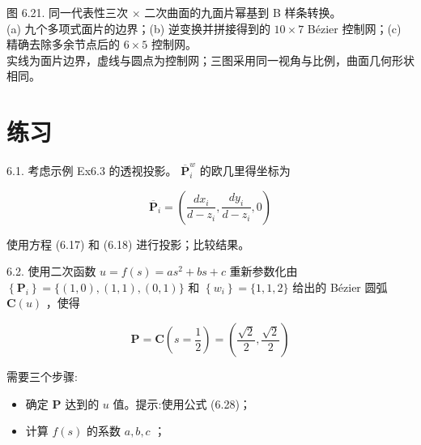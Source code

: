 \documentclass[../main.tex]{subfiles}
\begin{document}
\begin{center}
\begin{minipage}{28cm}
\vspace*{.6\baselineskip}
\centering
\begin{minipage}{13cm}\centering
{}
\end{minipage}
\par\medskip
\begin{minipage}{26.4cm}\centering
{}
\end{minipage}
\par\smallskip
图 6.21. 同一代表性三次 $\times$ 二次曲面的九面片幂基到 B 样条转换。\\
(a) 九个多项式面片的边界；(b) 逆变换并拼接得到的 $10\times7$ Bézier 控制网；(c) 精确去除多余节点后的 $6\times5$ 控制网。\\
实线为面片边界，虚线与圆点为控制网；三图采用同一视角与比例，曲面几何形状相同。
\end{minipage}
\end{center}

\section*{练习}

6.1. 考虑示例 Ex6.3 的透视投影。 \({\overline{\mathbf{P}}}_{i}^{w}\) 的欧几里得坐标为

\[
{\overline{\mathbf{P}}}_{i} = \left( {\frac{d{x}_{i}}{d - {z}_{i}},\frac{d{y}_{i}}{d - {z}_{i}},0}\right)
\]

使用方程 (6.17) 和 (6.18) 进行投影；比较结果。

6.2. 使用二次函数 \(u = f\left( s\right)  = a{s}^{2} + {bs} + c\) 重新参数化由 \(\left\{  {\mathbf{P}}_{i}\right\}   = \{ \left( {1,0}\right) ,\left( {1,1}\right) ,\left( {0,1}\right) \}\) 和 \(\left\{  {w}_{i}\right\}   = \{ 1,1,2\}\) 给出的 Bézier 圆弧 \(\mathbf{C}\left( u\right)\) ，使得

\[
\mathbf{P} = \mathbf{C}\left( {s = \frac{1}{2}}\right)  = \left( {\frac{\sqrt{2}}{2},\frac{\sqrt{2}}{2}}\right)
\]

需要三个步骤:

\begin{itemize}
\item 确定 \(\mathbf{P}\) 达到的 \(u\) 值。提示:使用公式 (6.28)；
\end{itemize}

\begin{itemize}
\item 计算 \(f\left( s\right)\) 的系数 \(a,b,c\) ；
\end{itemize}
\end{document}
